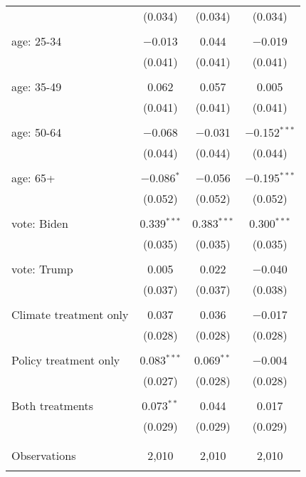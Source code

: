 \begin{tabular}{@{\extracolsep{5pt}}lccc}
  & (0.034) & (0.034) & (0.034) \\ 
  & & & \\ 
 age: 25-34 & $-$0.013 & 0.044 & $-$0.019 \\ 
  & (0.041) & (0.041) & (0.041) \\ 
  & & & \\ 
 age: 35-49 & 0.062 & 0.057 & 0.005 \\ 
  & (0.041) & (0.041) & (0.041) \\ 
  & & & \\ 
 age: 50-64 & $-$0.068 & $-$0.031 & $-$0.152$^{***}$ \\ 
  & (0.044) & (0.044) & (0.044) \\ 
  & & & \\ 
 age: 65+ & $-$0.086$^{*}$ & $-$0.056 & $-$0.195$^{***}$ \\ 
  & (0.052) & (0.052) & (0.052) \\ 
  & & & \\ 
 vote: Biden & 0.339$^{***}$ & 0.383$^{***}$ & 0.300$^{***}$ \\ 
  & (0.035) & (0.035) & (0.035) \\ 
  & & & \\ 
 vote: Trump & 0.005 & 0.022 & $-$0.040 \\ 
  & (0.037) & (0.037) & (0.038) \\ 
  & & & \\ 
 Climate treatment only & 0.037 & 0.036 & $-$0.017 \\ 
  & (0.028) & (0.028) & (0.028) \\ 
  & & & \\ 
 Policy treatment only & 0.083$^{***}$ & 0.069$^{**}$ & $-$0.004 \\ 
  & (0.027) & (0.028) & (0.028) \\ 
  & & & \\ 
 Both treatments & 0.073$^{**}$ & 0.044 & 0.017 \\ 
  & (0.029) & (0.029) & (0.029) \\ 
  & & & \\ 
\hline \\[-1.8ex] 

Observations & 2,010 & 2,010 & 2,010 \\ 
\hline 
\hline \\[-1.8ex] 
\end{tabular} 
